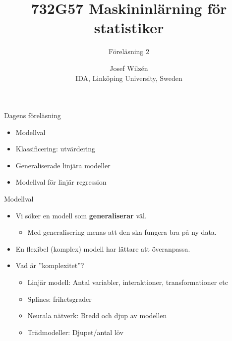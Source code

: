 \documentclass[10pt,english]{beamer}
\title{732G57  Maskininlärning för statistiker }
\subtitle{Föreläsning 2}
\date{}
\author{Josef Wilzén \\ IDA, Linköping University, Sweden}
\begin{document}
\maketitle

\begin{frame}{Dagens föreläsning}
    
    \begin{itemize}
        \item Modellval
        \item Klassificering: utvärdering
        \item Generaliserade linjära modeller
        \item Modellval för linjär regression
    \end{itemize}

\end{frame}

\begin{frame}{Modellval}
    
    \begin{itemize}
        \item Vi söker en modell som \textbf{generaliserar} väl.
        \begin{itemize}
            \item Med generalisering menas att den ska fungera bra på ny data.
        \end{itemize}
        \item En flexibel (komplex) modell har lättare att överanpassa.
        \item Vad är ''komplexitet''?
        \begin{itemize}
            \item Linjär modell: Antal variabler, interaktioner, transformationer etc
            \item Splines: frihetsgrader
            \item Neurala nätverk: Bredd och djup av modellen
            \item Trädmodeller: Djupet/antal löv
        \end{itemize}
    \end{itemize}

\end{frame}
\end{document}
